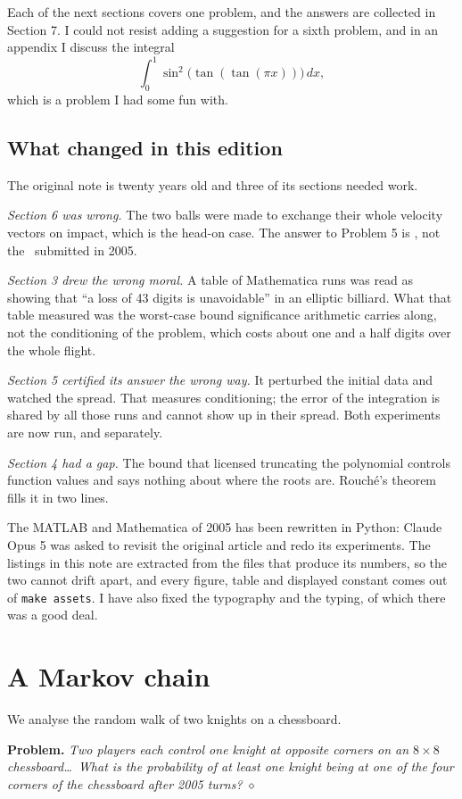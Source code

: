 \documentclass[11pt]{article}
\newcommand{\diam}{\hfill$\diamond$}
\begin{document}
Each of the next sections covers one problem, and the answers are collected
in Section 7. I could not resist adding a suggestion for a sixth problem,
and in an appendix I discuss the integral
\[
   \int_0^1 \sin^2\bigl(\tan(\tan(\pi x))\bigr)\,dx ,
\]
which is a problem I had some fun with.

\subsection{What changed in this edition}
The original note is twenty years old and three of its sections needed work.

\emph{Section 6 was wrong.} The two balls were made to exchange their whole
velocity vectors on impact, which is the head-on case. The answer to
Problem 5 is \bowlanswer, not the \bowlold\ submitted in 2005.

\emph{Section 3 drew the wrong moral.} A table of Mathematica runs was read
as showing that ``a loss of 43 digits is unavoidable'' in an elliptic
billiard. What that table measured was the worst-case bound significance
arithmetic carries along, not the conditioning of the problem, which costs
about one and a half digits over the whole flight.

\emph{Section 5 certified its answer the wrong way.} It perturbed the
initial data and watched the spread. That measures conditioning; the error
of the integration is shared by all those runs and cannot show up in their
spread. Both experiments are now run, and separately.

\emph{Section 4 had a gap.} The bound that licensed truncating the
polynomial controls function values and says nothing about where the roots
are. Rouch\'e's theorem fills it in two lines.

The MATLAB and Mathematica of 2005 has been rewritten in Python: Claude
Opus 5 was asked to revisit the original article and redo its experiments.
The listings in this note are extracted from the files that produce its
numbers, so the two cannot drift apart, and every figure, table and
displayed constant comes out of \texttt{make assets}. I have also fixed the
typography and the typing, of which there was a good deal.

\section{A Markov chain}
We analyse the random walk of two knights on a chessboard.

\noindent\textbf{Problem.} \emph{Two players each control one knight at
opposite corners on an $8\times 8$ chessboard\ldots\ What is the probability
of at least one knight being at one of the four corners of the chessboard
after 2005 turns?} \diam
\end{document}
